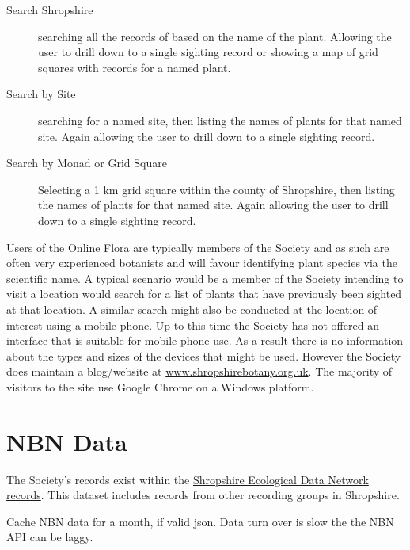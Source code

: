 \documentclass[a4paper,12pt,landscape]{article}
\begin{document}
\begin{multicols*}{2}
  \begin{description}
      \item[Search Shropshire]
        searching all the records of based on the name of the plant.
        Allowing the user to drill down to a single sighting record
        or
        showing a map of grid squares with records for a named plant.
      \item[Search by Site]
        searching for a named site,
        then listing the names of plants for that named site.
        Again allowing the user to drill down to a single sighting record.
      \item[Search by Monad or Grid Square]
        Selecting a 1 km grid square within the county of Shropshire,
        then listing the names of plants for that named site.
        Again allowing the user to drill down to a single sighting record.
  \end{description}

  Users of the Online Flora are typically
  members of the Society
  and
  as such are often very experienced botanists
  and will favour identifying
  plant species via the scientific name.
  A typical scenario would be a member of the Society
  intending to visit a location
  would search for a list of plants that have previously
  been sighted at that location.
  A similar search might also be
  conducted at the location of interest using a mobile phone.
  Up to this time the Society has not offered an interface that is suitable for mobile phone use.
  As a result there is no information about the types and sizes of the devices that might be used.
  However the Society does maintain a blog/website at 
  \href{https://www.shropshirebotany.org.uk/}{www.shropshirebotany.org.uk}.
  The majority of visitors to the site
  use Google Chrome on a Windows platform.

  \section{NBN Data}
  The Society's records exist within
  the \href{https://registry.nbnatlas.org/public/show/dp120}{Shropshire Ecological Data Network records}.
  This dataset includes records from other recording groups in Shropshire.

  \begin{description}
    \item Cache NBN data for a month, if valid json.
      Data turn over is slow the the NBN API can be laggy. 
    \item[] 
  \end{description} 

  
\end{multicols*}
\end{document}

